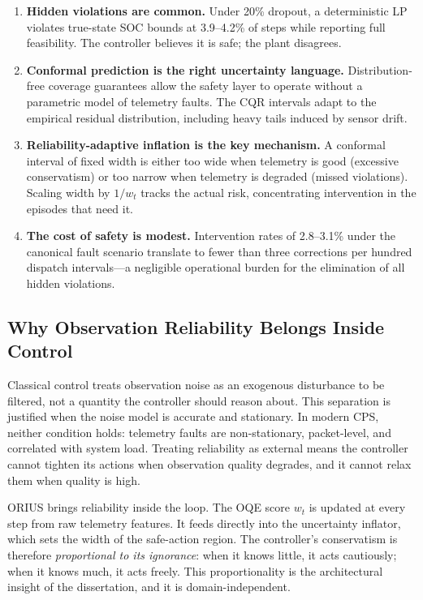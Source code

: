 \begin{enumerate}
  \item \textbf{Hidden violations are common.}  Under 20\% dropout, a
    deterministic LP violates true-state SOC bounds at 3.9--4.2\% of
    steps while reporting full feasibility.  The controller believes it
    is safe; the plant disagrees.
  \item \textbf{Conformal prediction is the right uncertainty language.}
    Distribution-free coverage guarantees allow the safety layer to operate
    without a parametric model of telemetry faults.  The CQR intervals
    adapt to the empirical residual distribution, including heavy tails
    induced by sensor drift.
  \item \textbf{Reliability-adaptive inflation is the key mechanism.}
    A conformal interval of fixed width is either too wide when telemetry
    is good (excessive conservatism) or too narrow when telemetry is
    degraded (missed violations).  Scaling width by $1/w_t$ tracks the
    actual risk, concentrating intervention in the episodes that need it.
  \item \textbf{The cost of safety is modest.}  Intervention rates of
    2.8--3.1\% under the canonical fault scenario translate to fewer than
    three corrections per hundred dispatch intervals---a negligible
    operational burden for the elimination of all hidden violations.
\end{enumerate}

\subsection{Why Observation Reliability Belongs Inside Control}

Classical control treats observation noise as an exogenous disturbance to
be filtered, not a quantity the controller should reason about.  This
separation is justified when the noise model is accurate and stationary.
In modern CPS, neither condition holds: telemetry faults are non-stationary,
packet-level, and correlated with system load.  Treating reliability as
external means the controller cannot tighten its actions when observation
quality degrades, and it cannot relax them when quality is high.

ORIUS brings reliability inside the loop.  The OQE score $w_t$ is updated
at every step from raw telemetry features.  It feeds directly into the
uncertainty inflator, which sets the width of the safe-action region.  The
controller's conservatism is therefore \emph{proportional to its ignorance}:
when it knows little, it acts cautiously; when it knows much, it acts
freely.  This proportionality is the architectural insight of the
dissertation, and it is domain-independent.

